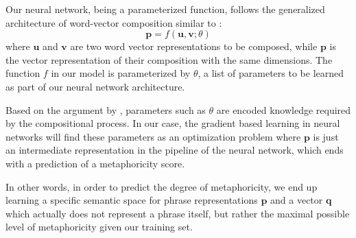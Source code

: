 Our neural network, being a parameterized function, follows the generalized architecture of word-vector composition similar to \cite{mitchell2010composition}:
\begin{equation}\label{eq:composition}
\mathbf{p} = f(\mathbf{u}, \mathbf{v}; \theta)
\end{equation}
where $\mathbf{u}$ and $\mathbf{v}$ are two word vector representations to be composed, while $\mathbf{p}$ is the vector representation of their composition with the same dimensions. The function $f$ in our model is parameterized by $\theta$, a list of parameters to be learned as part of our neural network architecture. 

Based on the argument by \cite{mitchell2010composition}, parameters such as $\theta$ are encoded knowledge required by the compositional process. In our case, the gradient based learning in neural networks will find these parameters as an optimization problem where $\mathbf{p}$ is just an intermediate representation in the pipeline of the neural network, which ends with a prediction of a metaphoricity score.

In other words, in order to predict the degree of metaphoricity, we end up learning a specific semantic space for phrase representations $\mathbf{p}$ and a vector $\mathbf{q}$ which actually does not represent a phrase itself, but rather the maximal possible level of metaphoricity given our training set.

